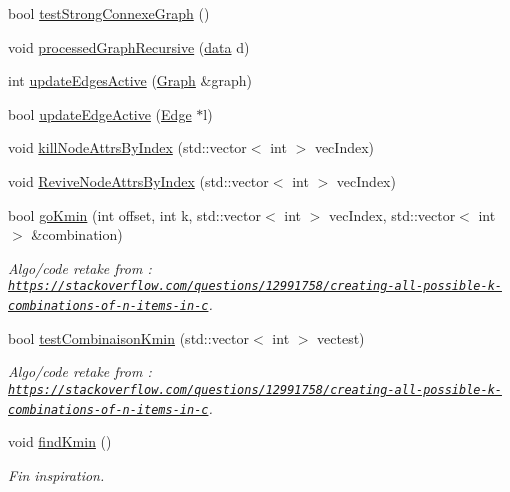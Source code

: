 \begin{DoxyCompactItemize}
\item 
bool \mbox{\hyperlink{struct_algorithm_a9a76807cae303dac7bcac84e18b00c86}{test\+Strong\+Connexe\+Graph}} ()
\item 
void \mbox{\hyperlink{struct_algorithm_aa3909b7cd8efd5c0d2351bcb7923e888}{processed\+Graph\+Recursive}} (\mbox{\hyperlink{_graph_8h_a98cbe1f79429fc62806b32b6e8871d9e}{data}} d)
\item 
int \mbox{\hyperlink{struct_algorithm_a75651c6f1997fa2db893b4b3d4a467d8}{update\+Edges\+Active}} (\mbox{\hyperlink{class_graph}{Graph}} \&graph)
\item 
bool \mbox{\hyperlink{struct_algorithm_af2d2eace16e689391c4b11e205251657}{update\+Edge\+Active}} (\mbox{\hyperlink{class_edge}{Edge}} $\ast$l)
\item 
void \mbox{\hyperlink{struct_algorithm_a1cfa3e81c301424fcb77642926abd66e}{kill\+Node\+Attrs\+By\+Index}} (std\+::vector$<$ int $>$ vec\+Index)
\item 
void \mbox{\hyperlink{struct_algorithm_a3254a9cd92b951a41d1d9cd931e6672b}{Revive\+Node\+Attrs\+By\+Index}} (std\+::vector$<$ int $>$ vec\+Index)
\item 
bool \mbox{\hyperlink{struct_algorithm_a6596dc464bb675414435c341a76cd2b6}{go\+Kmin}} (int offset, int k, std\+::vector$<$ int $>$ vec\+Index, std\+::vector$<$ int $>$ \&combination)
\begin{DoxyCompactList}\small\item\em Algo/code retake from \+: \href{https://stackoverflow.com/questions/12991758/creating-all-possible-k-combinations-of-n-items-in-c}{\tt https\+://stackoverflow.\+com/questions/12991758/creating-\/all-\/possible-\/k-\/combinations-\/of-\/n-\/items-\/in-\/c}. \end{DoxyCompactList}\item 
bool \mbox{\hyperlink{struct_algorithm_a9531505ffb0b7f99320dee47e97376bc}{test\+Combinaison\+Kmin}} (std\+::vector$<$ int $>$ vectest)
\begin{DoxyCompactList}\small\item\em Algo/code retake from \+: \href{https://stackoverflow.com/questions/12991758/creating-all-possible-k-combinations-of-n-items-in-c}{\tt https\+://stackoverflow.\+com/questions/12991758/creating-\/all-\/possible-\/k-\/combinations-\/of-\/n-\/items-\/in-\/c}. \end{DoxyCompactList}\item 
void \mbox{\hyperlink{struct_algorithm_a83933a235de08f4eb72485921a2c576c}{find\+Kmin}} ()
\begin{DoxyCompactList}\small\item\em Fin inspiration. \end{DoxyCompactList}\item 

\end{DoxyCompactItemize}
